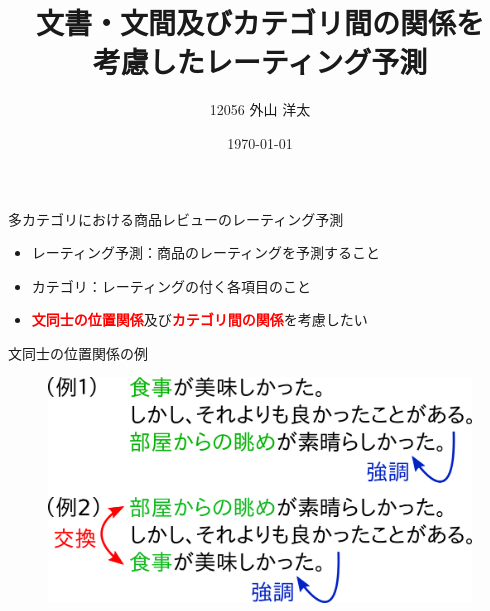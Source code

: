 \documentclass[aspectratio=43,unicode,10pt]{beamer}
\title{文書・文間及びカテゴリ間の関係を\\考慮したレーティング予測}
\institute{知能数理研究室}
\author{12056 外山 洋太}
\date{\today}
\newcommand{\fire}[1]{\textcolor{red}{\textbf{#1}}}
\begin{document}
\begin{frame}
\titlepage
\end{frame}

\begin{frame}{多カテゴリにおける商品レビューのレーティング予測}{}
  \begin{itemize}
    \item レーティング予測：商品のレーティングを予測すること
    \item カテゴリ：レーティングの付く各項目のこと
    \item \fire{文同士の位置関係}及び\fire{カテゴリ間の関係}を考慮したい
  \end{itemize}
  \begin{figure}
    \fboxsep=2mm
  \end{figure}
\end{frame}

\begin{frame}{文同士の位置関係の例}{}
  \begin{figure}
    \includegraphics[width=0.8\linewidth]
                    {fig/relations_among_sentences.png}
  \end{figure}
\end{frame}
\end{document}
